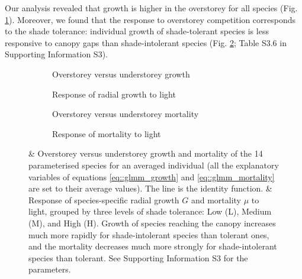 Our analysis revealed that growth is higher in the overstorey for all species (Fig. \ref{fig::over_under}). Moreover, we found that the response to overstorey competition corresponds to the shade tolerance: individual growth of shade-tolerant species is less responsive to canopy gaps than shade-intolerant species (Fig. \ref{fig::groups}; Table S3.6 in Supporting Information S3).
\begin{figure}
\begin{subfigure}[t]{.48\textwidth}
	\centering
	
	\caption{Overstorey versus understorey growth}
	\label{fig::over_under}
\end{subfigure}
\hfill
\begin{subfigure}[t]{.48\textwidth}
	\centering
	
	\caption{Response of radial growth to light}
	\label{fig::groups}
\end{subfigure}
\medskip
\begin{subfigure}[t]{.48\textwidth}
	\centering
	
	\caption{Overstorey versus understorey mortality}
	\label{fig::over_under_mu}
\end{subfigure}
\hfill
\begin{subfigure}[t]{.48\textwidth}
	\centering
	
	\caption{Response of mortality to light}
	\label{fig::groups_mu}
\end{subfigure}
\caption{ \&  Overstorey versus understorey growth and mortality of the 14 parameterised species for an averaged individual (\ie all the explanatory variables of equations \eqref{eq::glmm_growth} and \eqref{eq::glmm_mortality} are set to their average values). The line is the identity function.  \&  Response of species-specific radial growth $ G $ and mortality $ \mu $ to light, grouped by three levels of shade tolerance: Low (L), Medium (M), and High (H). Growth of species reaching the canopy increases much more rapidly for shade-intolerant species than tolerant ones, and the mortality decreases much more strongly for shade-intolerant species than tolerant. See Supporting Information S3 for the parameters.}
\label{fig::growthMortalityResults}
\end{figure}


